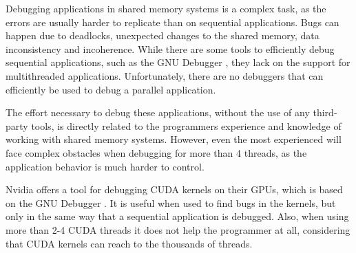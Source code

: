 Debugging applications in shared memory systems is a complex task, as the errors are usually harder to replicate than on sequential applications. Bugs can happen due to deadlocks, unexpected changes to the shared memory, data inconsistency and incoherence. While there are some tools to efficiently debug sequential applications, such as the GNU Debugger \cite{GDB}, they lack on the support for multithreaded applications. Unfortunately, there are no debuggers that can efficiently be used to debug a parallel application.

The effort necessary to debug these applications, without the use of any third-party tools, is directly related to the programmers experience and knowledge of working with shared memory systems. However, even the most experienced will face complex obstacles when debugging for more than 4 threads, as the application behavior is much harder to control.

Nvidia offers a tool for debugging CUDA kernels on their GPUs, which is based on the GNU Debugger \cite{NVIDIA:gdb}. It is useful when used to find bugs in the kernels, but only in the same way that a sequential application is debugged. Also, when using more than 2-4 CUDA threads it does not help the programmer at all, considering that CUDA kernels can reach to the thousands of threads.
